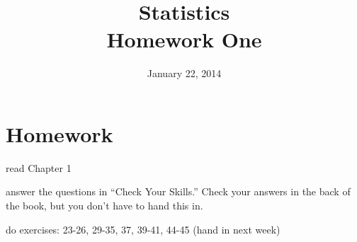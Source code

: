 \documentclass{exam}
\title{Statistics \\ Homework One}
\author{}
\date{January 22, 2014}
\begin{document}
  \maketitle

  \section{Homework}
  \ifprintanswers
  \else
    \begin{itemize*}
      \item read Chapter 1 
      \item answer the questions in ``Check Your Skills.''  Check your answers in the back of the book, but you don't
        have to hand this in.
      \item do exercises: 23-26, 29-35, 37, 39-41, 44-45 (hand in next week)
    \end{itemize*}
  \fi
\end{document}
